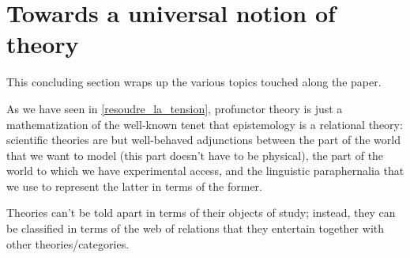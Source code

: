 \section{Towards a universal notion of theory}\label{sec_6_universal}
This concluding section wraps up the various topics touched along the paper.

\medskip
As we have seen in \autoref{resoudre_la_tension}, profunctor theory is just a mathematization of the well-known tenet that epistemology is a relational theory: scientific theories are but well-behaved adjunctions between the part of the world that we want to model (this part doesn't have to be physical), the part of the world to which we have experimental access, and the linguistic paraphernalia that we use to represent the latter in terms of the former.

Theories can't be told apart in terms of their objects of study; instead, they can be classified in terms of the web of relations that they entertain together with other theories/categories.

